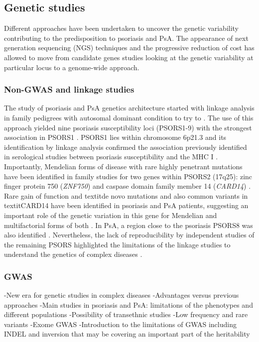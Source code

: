 {\subsection{Genetic studies}
Different approaches have been undertaken to uncover the genetic variability contributing to the predisposition to psoriasis and PsA. The appearance of next generation sequencing (NGS) techniques and the progressive reduction of cost has allowed to move from candidate genes studies looking at the genetic variability at particular locus to a genome-wide approach.

\subsubsection{Non-GWAS and linkage studies}
The study of psoriasis and PsA genetics architecture started with linkage analysis in family pedigrees with autosomal dominant condition to try to . The use of this approach yielded nine psoriasis susceptibility loci (PSORS1-9) \parencite{Capon2017} with the strongest association in PSORS1 \parencite{International2003}. PSORS1 lies within chromosome 6p21.3 and its identification by linkage analysis confirmed the association previously identified in serological studies between psoriasis susceptibility and the MHC I \parencite{Rusell1972, Tiilikainen1980}. Importantly, Mendelian forms of disease with rare highly penetrant mutations have been identified in family studies for two genes within PSORS2 (17q25): zinc finger protein 750 (\textit{ZNF750}) \parencite{Tomfohrde1994} and caspase domain family member 14 (\textit{CARD14}) \parencite{Jordan2012}. Rare gain of function and textit{de novo} mutations and also common variants in textit{CARD14} have been identified in psoriasis and PsA patients, suggesting an important role of the genetic variation in this gene for Mendelian and multifactorial forms of both \parencite {Jordan2012, GWAS study}. In PsA, a region close to the psoriasis PSORS8 was also identified \parencite{Karason2003}. Nevertheless, the lack of reproducibility by independent studies of the remaining PSORS highlighted the limitations of the linkage studies to understand the genetics of complex diseases \parencite{Capon2017}.


\subsubsection{GWAS}
-New era for genetic studies in complex diseases
-Advantages versus previous approaches
-Main studies in psoriasis and PsA: limitations of the phenotypes and different populations
-Possibility of transethnic studies
-Low frequency and rare variants
-Exome GWAS
-Introduction to the limitations of GWAS including INDEL and inversion that may be covering an important part of the heritability

}
